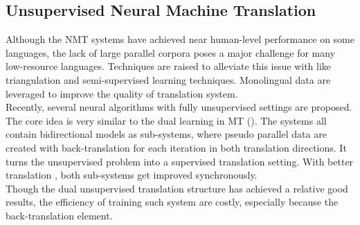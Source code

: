 %
%






\subsection{Unsupervised Neural Machine Translation}
 Although the NMT systems have achieved near human-level performance on some languages, the lack of large parallel corpora poses a major challenge for many low-resource languages.
 Techniques are raised to alleviate this issue with like triangulation and semi-supervised learning techniques.  Monolingual data are leveraged to improve the quality of translation system. \\
 Recently, several neural algorithms with fully unsupervised settings are proposed. The core idea is very similar to the dual learning in MT (\cite{he2016dual}). The systems all contain bidirectional models as sub-systems, where pseudo parallel data are created with back-translation for each iteration in both translation directions. It turns the unsupervised problem into a supervised translation setting. With better translation , both sub-systems get improved synchronously.\\
 Though the dual unsupervised translation structure has achieved a relative good results, the efficiency of training such system are costly, especially because the back-translation element.





